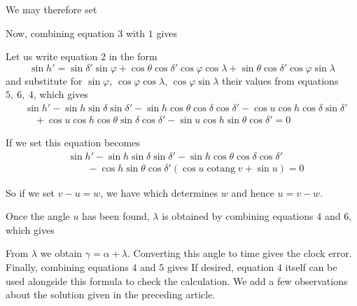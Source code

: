 We may therefore set

\SourceGathering{6\textsuperscript{*}}Now, combining equation $3$ with $1$ gives

Let us write equation $2$ in the form
\[
\sin h'=\sin\delta'\sin\varphi+\cos\theta\cos\delta'\cos\varphi\cos\lambda+\sin\theta\cos\delta'\cos\varphi\sin\lambda
\]
and substitute for $\sin\varphi$, $\cos\varphi\cos\lambda$, $\cos\varphi\sin\lambda$ their values from equations $5,\ 6,\ 4$, which gives
\[
\begin{aligned}
&\sin h'-\sin h\sin\delta\sin\delta'-\sin h\cos\theta\cos\delta\cos\delta'-\cos u\cos h\cos\delta\sin\delta'\\
&\quad+\cos u\cos h\cos\theta\sin\delta\cos\delta'-\sin u\cos h\sin\theta\cos\delta'=0
\end{aligned}
\]

If we set
this equation becomes
\[
\begin{aligned}
&\sin h'-\sin h\sin\delta\sin\delta'-\sin h\cos\theta\cos\delta\cos\delta'\\
&\qquad-\cos h\sin\theta\cos\delta'(\cos u\operatorname{cotang}v+\sin u)=0
\end{aligned}
\]

So if we set $v-u=w$, we have
which determines $w$ and hence $u=v-w$.

Once the angle $u$ has been found, $\lambda$ is obtained by combining equations $4$ and $6$, which gives

From $\lambda$ we obtain $\gamma=\alpha+\lambda$. Converting this angle to time gives the clock error. Finally, combining equations $4$ and $5$ gives
If desired, equation $4$ itself can be used alongside this formula to check the calculation.
We add a few observations about the solution given in the preceding article.

